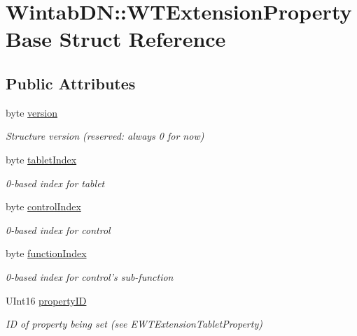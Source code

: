 \hypertarget{struct_wintab_d_n_1_1_w_t_extension_property_base}{
\section{WintabDN::WTExtensionPropertyBase Struct Reference}
\label{struct_wintab_d_n_1_1_w_t_extension_property_base}
}
\subsection*{Public Attributes}
\begin{DoxyCompactItemize}
\item 
byte \hyperlink{struct_wintab_d_n_1_1_w_t_extension_property_base_a3878c5d6db8c4e005e38f554f18ad267}{version}
\begin{DoxyCompactList}\small\item\em Structure version (reserved: always 0 for now) \item\end{DoxyCompactList}\item 
byte \hyperlink{struct_wintab_d_n_1_1_w_t_extension_property_base_acc18cec8a354e50809557a5cdfd017dc}{tabletIndex}
\begin{DoxyCompactList}\small\item\em 0-\/based index for tablet \item\end{DoxyCompactList}\item 
byte \hyperlink{struct_wintab_d_n_1_1_w_t_extension_property_base_a3af5bc46a6f7c1be248e7f34172f62eb}{controlIndex}
\begin{DoxyCompactList}\small\item\em 0-\/based index for control \item\end{DoxyCompactList}\item 
byte \hyperlink{struct_wintab_d_n_1_1_w_t_extension_property_base_a0c4b63f73615120e7e234ae27b4482ee}{functionIndex}
\begin{DoxyCompactList}\small\item\em 0-\/based index for control's sub-\/function \item\end{DoxyCompactList}\item 
UInt16 \hyperlink{struct_wintab_d_n_1_1_w_t_extension_property_base_a01f5a7c7a3aecada5a4c9d6ab2b63a8e}{propertyID}
\begin{DoxyCompactList}\small\item\em ID of property being set (see EWTExtensionTabletProperty) \item\end{DoxyCompactList}\item 

\end{DoxyCompactItemize}
